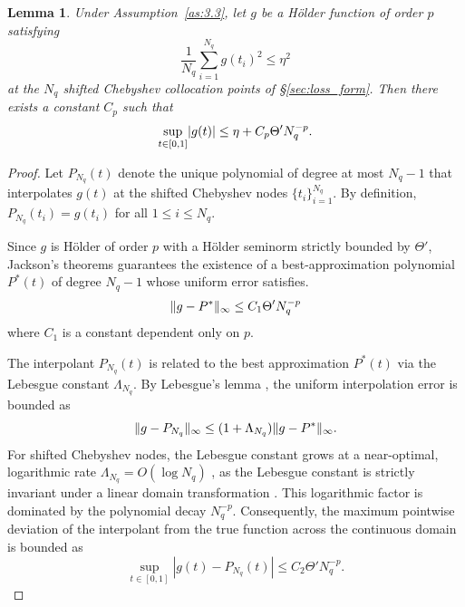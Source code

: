 \documentclass[11pt, a4paper]{article}
\theoremstyle{theoremstyle}
\newtheorem{lemma}[theorem]{Lemma}
\theoremstyle{definitionstyle}
\DeclarePairedDelimiter{\norm}{\lVert}{\rVert}
\DeclarePairedDelimiter{\abs}{\lvert}{\rvert}
\begin{document}
\begin{lemma}\label{lem:3.4}
    Under Assumption~\ref{as:3.3}, let \( g \) be a H\"older function of order \( p \) satisfying
    \begin{equation}
        \frac 1{N_q} \sum_{i=1}^{N_q} g(t_i)^2 \leq \eta^2
    \end{equation}
    at the \( N_q \) shifted Chebyshev collocation points of \S\ref{sec:loss_form}. Then there exists a constant \(C_p\) such that
    \begin{equation}
        \sup_{t \in [0, 1]} \abs{g(t)} \leq \eta + C_p\Theta'N_q^{-p}.
    \end{equation}
\end{lemma}
\begin{proof}
Let \( P_{N_q}(t) \) denote the unique polynomial of degree at most \( N_q - 1 \) that interpolates \( g(t) \) at the shifted Chebyshev nodes \( \{t_i\}_{i=1}^{N_q} \). By definition, \( P_{N_q}(t_i) = g(t_i) \) for all \( 1 \le i \le N_q \).

Since \( g \) is H\"older of order \( p \) with a H\"older seminorm strictly bounded by \( \Theta' \), Jackson's theorems \cite[\S2.9, \S7.6]{devore1993constructive} guarantees the existence of a best-approximation polynomial \( P^*(t) \) of degree \( N_q - 1 \) whose uniform error satisfies.
\begin{equation}
    \norm{g - P^*}_\infty \le C_1 \Theta' N_q^{-p}
\end{equation}
where \( C_1 \) is a constant dependent only on \( p \).

The interpolant \( P_{N_q}(t) \) is related to the best approximation \( P^*(t) \) via the Lebesgue constant \( \Lambda_{N_q} \). By Lebesgue's lemma \cite[\S2.4]{devore1993constructive}, the uniform interpolation error is bounded as
\begin{equation}
    \norm{g - P_{N_q}}_\infty \le (1 + \Lambda_{N_q}) \norm{g - P^*}_\infty.
\end{equation}
For shifted Chebyshev nodes, the Lebesgue constant grows at a near-optimal, logarithmic rate \( \Lambda_{N_q} = O(\log N_q) \) \cite{Bos2012}, as the Lebesgue constant is strictly invariant under a linear domain transformation \cite{Ibrahimoglu2016}. This logarithmic factor is dominated by the polynomial decay \( N_q^{-p} \). Consequently, the maximum pointwise deviation of the interpolant from the true function across the continuous domain is bounded as
\begin{equation}
    \sup_{t \in [0,1]} |g(t) - P_{N_q}(t)| \le C_2 \Theta' N_q^{-p}.
\end{equation}


\end{proof}
\end{document}
